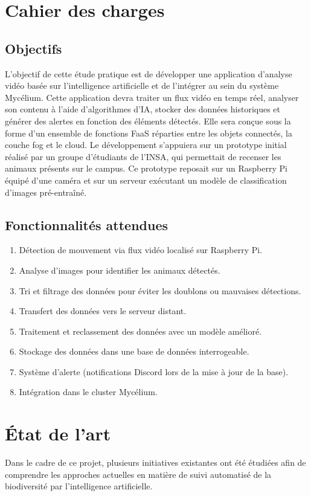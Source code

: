 \documentclass[a4paper,11pt]{article}
\begin{document}
	\section{Cahier des charges}
	\subsection{Objectifs}
	L’objectif de cette étude pratique est de développer une application d’analyse vidéo basée sur l’intelligence artificielle et de l’intégrer au sein du système Mycélium. Cette application devra traiter un flux vidéo en temps réel, analyser son contenu à l’aide d’algorithmes d’IA, stocker des données historiques et générer des alertes en fonction des éléments détectés. Elle sera conçue sous la forme d’un ensemble de fonctions FaaS réparties entre les objets connectés, la couche fog et le cloud. Le développement s’appuiera sur un prototype initial réalisé par un groupe d’étudiants de l’INSA, qui permettait de recenser les animaux présents sur le campus. Ce prototype reposait sur un Raspberry Pi équipé d’une caméra et sur un serveur exécutant un modèle de classification d’images pré-entraîné.
	\subsection{Fonctionnalités attendues}
	\begin{enumerate}
	\item Détection de mouvement via flux vidéo localisé sur Raspberry Pi.
	\item Analyse d’images pour identifier les animaux détectés.
	\item Tri et filtrage des données pour éviter les doublons ou mauvaises détections.
	\item Transfert des données vers le serveur distant.
	\item Traitement et reclassement des données avec un modèle amélioré.
	\item Stockage des données dans une base de données interrogeable.
	\item Système d’alerte (notifications Discord lors de la mise à jour de la base).
	\item Intégration dans le cluster Mycélium.
	\end{enumerate}
	
	\section{État de l'art}
	Dans le cadre de ce projet, plusieurs initiatives existantes ont été étudiées afin de comprendre les approches actuelles en matière de suivi automatisé de la biodiversité par l'intelligence artificielle.
	
\end{document}
